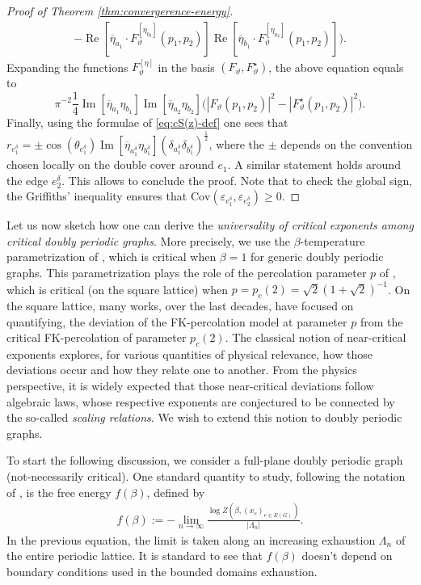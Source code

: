 \documentclass[reqno]{amsart}
\numberwithin{equation}{section}
\theoremstyle{definition}
\theoremstyle{remark}
\renewcommand\Re{\operatorname{Re}}
\renewcommand\Im{\operatorname{Im}}
\begin{document}
\begin{proof}[Proof of Theorem \ref{thm:convergerence-energy}]
\begin{multline*}
	- \Re[\overline{\eta}_{a_1}\cdot F_{\vartheta}^{[\eta_{b_2}]}(p_1,p_2)]\Re[\overline{\eta}_{b_1}\cdot F_{\vartheta}^{[\eta_{a_2}]}(p_1,p_2)]\Big).
\end{multline*}
Expanding the functions $F_{\vartheta}^{[\eta]}$ in the basis $(F_{\vartheta}, F^\star_{\vartheta})$, the above equation equals to 
\begin{equation*}
	\pi^{-2} \frac{1}{4}\Im[\overline{\eta}_{a_1}\eta_{b_1}]\Im[\overline{\eta}_{a_2}\eta_{b_2}]
	\big(|F_{\vartheta}(p_1,p_2)|^2 - |F^\star_{\vartheta}(p_1,p_2)|^2\big).
\end{equation*}
Finally, using the formulae of \eqref{eq:cS(z)-def} one sees that $r_{e_1^\delta}= \pm \cos(\theta_{e_1^\delta}) \Im[\overline{\eta}_{a_1^\delta}\eta_{b_1^\delta}](\delta_{a_1^\delta}\delta_{b_1^\delta})^{\frac{1}{2}} $, where the $\pm$ depends on the convention chosen locally on the double cover around $e_1$. A similar statement holds around the edge $e_2^\delta$. This allows to conclude the proof. Note that to check the global sign, the Griffiths' inequality ensures that $\textrm{Cov}(\varepsilon_{e_1^\delta},\varepsilon_{e_2^\delta}) \geq 0 $.

\end{proof}

Let us now sketch how one can derive the \emph{universality of critical exponents among critical doubly periodic graphs}. More precisely, we use the $\beta$-temperature parametrization of \cite[Theorem 1.1]{lis-kites}, which is critical when $\beta=1$ for generic doubly periodic graphs. This parametrization plays the role of the percolation parameter $p$ of \cite[(1.3)]{FK_scaling_relations}, which is critical (on the square lattice) when $p=p_c(2)=\sqrt{2}(1+\sqrt{2})^{-1}$. 
On the square lattice, many works, over the last decades, have focused on quantifying, the deviation of the FK-percolation model at parameter $p$ from the critical FK-percolation of parameter $p_c(2)$. 
The classical notion of near-critical exponents \cite{FK_scaling_relations} explores, for various quantities of physical relevance,  how those deviations occur and how they relate one to another.
 From the physics perspective, it is widely expected that those near-critical deviations follow algebraic laws, whose respective exponents are conjectured to be connected by the so-called \emph{scaling relations}. We wish to extend this notion to doubly periodic graphs.

To start the following discussion, we consider a full-plane doubly periodic graph (not-necessarily critical). One standard quantity to study,  following the notation of \cite{FK_scaling_relations}, is the free energy $f(\beta)$, defined by
\begin{align*}
f(\beta):= -\lim_{n\to \infty}\frac{\log Z(\beta,(x_e)_{e\in E(G)})}{|\Lambda_n|}.
\end{align*}
In the previous equation, the limit is taken along an increasing exhaustion $\Lambda_n$ of the entire periodic lattice. It is standard to see that $f(\beta)$ doesn't depend on boundary conditions used in the bounded domains exhaustion. 
\end{document}
